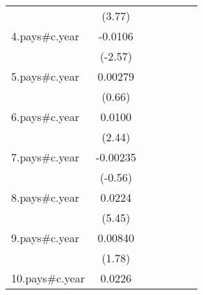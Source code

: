{\begin{tabular}{l*{6}{c}}
                    &      (3.77)         &                     &                     &                     &                     &                     \\
[1em]
4.pays#c.year       &     -0.0106\sym{*}  &                     &                     &                     &                     &                     \\
                    &     (-2.57)         &                     &                     &                     &                     &                     \\
[1em]
5.pays#c.year       &     0.00279         &                     &                     &                     &                     &                     \\
                    &      (0.66)         &                     &                     &                     &                     &                     \\
[1em]
6.pays#c.year       &      0.0100\sym{*}  &                     &                     &                     &                     &                     \\
                    &      (2.44)         &                     &                     &                     &                     &                     \\
[1em]
7.pays#c.year       &    -0.00235         &                     &                     &                     &                     &                     \\
                    &     (-0.56)         &                     &                     &                     &                     &                     \\
[1em]
8.pays#c.year       &      0.0224\sym{***}&                     &                     &                     &                     &                     \\
                    &      (5.45)         &                     &                     &                     &                     &                     \\
[1em]
9.pays#c.year       &     0.00840         &                     &                     &                     &                     &                     \\
                    &      (1.78)         &                     &                     &                     &                     &                     \\
[1em]
10.pays#c.year      &      0.0226\sym{***}&                     &                     &                     &                     &                     \\

\end{tabular}}
